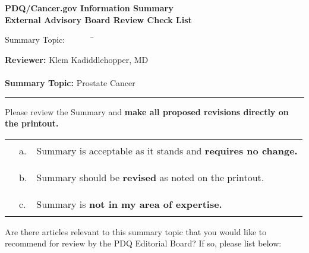 \documentclass[letterpaper,12pt]{letter}
\begin{document}
\thispagestyle{empty}

\begin{center}
 \textbf{PDQ\textregistered/Cancer.gov Information Summary \\
         External Advisory Board Review Check List}
\end{center}

\vspace{24pt}

\begin{tabbing}

Summary Topic:\ \ \ \ \ \ \  \= \kill

\textbf{Reviewer: } \> Klem Kadiddlehopper, MD \\

\\

\textbf{Summary Topic: } \> Prostate Cancer

\end{tabbing}

\rule{6.5in}{.02in}

\vspace{12pt}

Please review the Summary and \textbf{make all proposed revisions 
directly on the printout.}

\vspace{12pt}

\begin{tabular}{llp{4.5in}}
\hspace{.25in}\rule{1in}{.01in} & a. & Summary is acceptable as it stands 
                                       and \textbf{requires no change.} \\
\\
\hspace{.25in}\rule{1in}{.01in} & b. & Summary should be \textbf{revised}
                                       as noted on the printout. \\
\\
\hspace{.25in}\rule{1in}{.01in} & c. & Summary is \textbf{not in my area
                                       of expertise.}
\end{tabular}

\vspace{18pt}

Are there articles relevant to this summary topic that you would like to
recommend for review by the PDQ\textregistered{} Editorial Board?  If so,
please list below:
\end{document}
